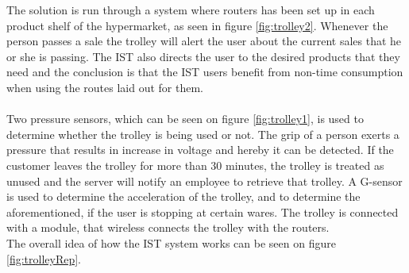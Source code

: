 The solution is run through a system where routers has been set up in each product shelf of the hypermarket, as seen in figure  \ref{fig:trolley2}. Whenever the person passes a sale the trolley will alert the user about the current sales that he or she is passing. The IST also directs the user to the desired products that they need and the conclusion is that the IST users benefit from non-time consumption when using the routes laid out for them.\\
\\
Two pressure sensors, which can be seen on figure \ref{fig:trolley1}, is used to determine whether the trolley is being used or not. The grip of a person exerts a pressure that results in increase in voltage and hereby it can be detected. If the customer leaves the trolley for more than 30 minutes, the trolley is treated as unused and the server will notify an employee to retrieve that trolley.
A G-sensor is used to determine the acceleration of the trolley, and to determine the aforementioned, if the user is stopping at certain wares. The trolley is connected with a module, that wireless connects the trolley with the routers.\\
The overall idea of how the IST system works can be seen on figure \ref{fig:trolleyRep}.

